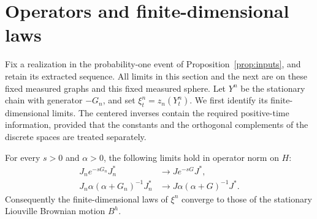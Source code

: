 \section{Operators and finite-dimensional laws}\label{sec:operators}

Fix a realization in the probability-one event of
Proposition~\ref{prop:inputs}, and retain its extracted sequence. All limits in
this section and the next are on these fixed measured graphs and this fixed
measured sphere. Let $Y^n$ be the stationary chain with generator $-G_n$, and set
$\xi^n_t=z_n(Y^n_t)$. We first identify its finite-dimensional limits. The
centered inverses contain the required positive-time information, provided that
the constants and the orthogonal complements of the discrete spaces are
treated separately.

\begin{proposition}\label{prop:operators}
For every $s>0$ and $\alpha>0$, the following limits hold in operator norm on
$H$:
\begin{align}
 J_n e^{-sG_n}J_n^*&\longrightarrow J e^{-sG}J^*,
 \label{eq:semigroup-convergence}\\
 J_n\alpha(\alpha+G_n)^{-1}J_n^*
 &\longrightarrow J\alpha(\alpha+G)^{-1}J^*.
 \label{eq:resolvent-convergence}
\end{align}
Consequently the finite-dimensional laws of $\xi^n$ converge to those of
the stationary Liouville Brownian motion $B^h$.
\end{proposition}

